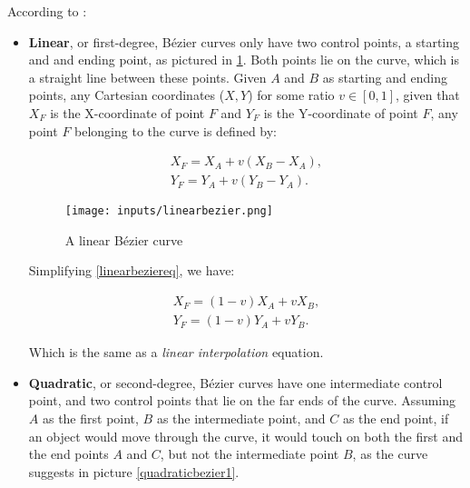 \documentclass[cic,tc,english]{iiufrgs}
\begin{document}
According to \citet{Mortenson1999mathcomputergraphics}:
\begin{itemize}
\item \textbf{Linear}, or first-degree, Bézier curves only have two control points, a starting and and ending point, as pictured in \cref{linearbezier}. Both points lie on the curve, which is a straight line between these points. Given $A$ and $B$ as starting and ending points, any Cartesian coordinates ($X,Y$) for some  ratio $v \in [0,1]$, given that $X_F$ is the X-coordinate of point $F$ and $Y_F$ is the Y-coordinate of point $F$, any point $F$ belonging to the curve is defined by:

\begin{equation}
    \begin{array}{c}
        {X_F} = {X_A} + v({X_B} - {X_A}), \\
        {Y_F} = {Y_A} + v({Y_B} - {Y_A}).
    \end{array}
    \label{linearbeziereq}
\end{equation}

\begin{figure}[t!]
    \caption{A linear Bézier curve}
    \begin{center}
        \texttt{[image: inputs/linearbezier.png]}
    \end{center}
    \label{linearbezier}
\end{figure}

Simplifying \cref{linearbeziereq}, we have:

\begin{equation}
    \begin{array}{c}
        {X_F} = (1-v){X_A} + v{X_B}, \\
        {Y_F} = (1-v){Y_A} + v{Y_B}.
    \end{array}
\end{equation}

Which is the same as a \textit{linear interpolation} equation.

\item \textbf{Quadratic}, or second-degree, Bézier curves have one intermediate control point, and two control points that lie on the far ends of the curve. Assuming $A$ as the first point, $B$ as the intermediate point, and $C$ as the end point, if an object would move through the curve, it would touch on both the first and the end points $A$ and $C$, but not the intermediate point $B$, as the curve suggests in picture \cref{quadraticbezier1}.


\end{itemize}
\end{document}
